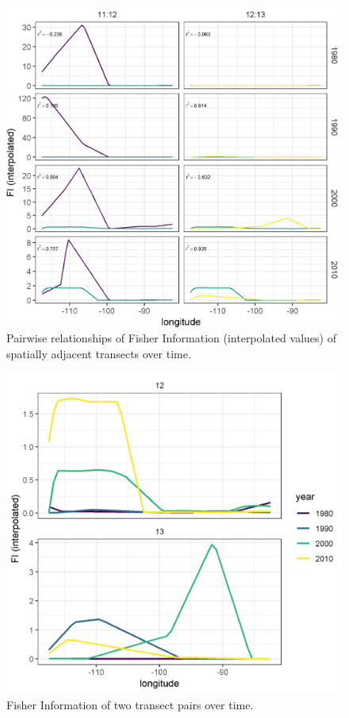 \documentclass[12pt,twoside,openany]{reedthesis}
\begin{document}
\begin{figure}[h]

{\centering \includegraphics[width=0.85\linewidth]{./chapterFiles/fisherSpatial/figures/figsCalledInDiss/interpolated_FI_corplotSelectTransects_East-West} 

}

\caption{Pairwise relationships of Fisher Information (interpolated values) of spatially adjacent transects over time. }\label{fig:corPlotTsectsInterp}
\end{figure}
\begin{figure}[h]

{\centering \includegraphics[width=0.85\linewidth]{./chapterFiles/fisherSpatial/figures/figsCalledInDiss/interp_FI_singlePair_corPlot_East-West} 

}

\caption{Fisher Information of two transect pairs over time. }\label{fig:fiSinglePair}
\end{figure}
\end{document}
